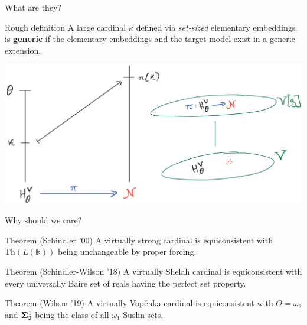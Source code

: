 \documentclass{beamer}
\begin{document}
\begin{frame}{What are they?}
  \begin{block}{Rough definition}
    A large cardinal $\kappa$ defined via \textit{set-sized} elementary embeddings is \textbf{generic} if the elementary embeddings {\color{red} and the target model} exist in a generic extension.
  \end{block}

  \begin{center}
    \includegraphics[scale=0.15]{gfx/generic.jpg}
  \end{center}
\end{frame}

\begin{frame}{Why should we care?}
  \begin{block}{Theorem (Schindler '00)}
    A virtually strong cardinal is equiconsistent with $\text{Th}(L(\mathbb R))$ being unchangeable by proper forcing.
  \end{block}
  
  \pause

  \begin{block}{Theorem (Schindler-Wilson '18)}
    A virtually Shelah cardinal is equiconsistent with every universally Baire set of reals having the perfect set property.
  \end{block}

  \pause
  
  \begin{block}{Theorem (Wilson '19)}
    A virtually Vop\v enka cardinal is equiconsistent with $\Theta=\omega_2$ and ${\bf\Sigma}^1_2$ being the class of all $\omega_1$-Suslin sets.
  \end{block}
\end{frame}
\end{document}
